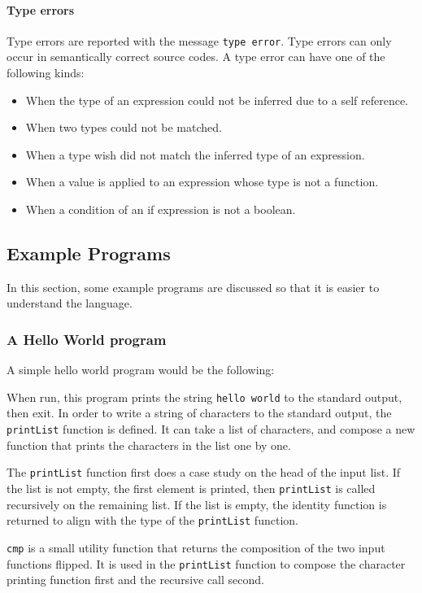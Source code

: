 \documentclass[12pt]{article}
\begin{document}
\paragraph{Type errors} Type errors are reported with the message
\verb$type error$. Type errors can only occur in semantically correct source
codes. A type error can have one of the following kinds:
\begin{itemize}
    \item When the type of an expression could not be inferred due to a self
        reference.
    \item When two types could not be matched.
    \item When a type wish did not match the inferred type of an expression.
    \item When a value is applied to an expression whose type is not a function.
    \item When a condition of an if expression is not a boolean.
\end{itemize}

\subsection{Example Programs}
\lstset{numbers=left}

In this section, some example programs are discussed so that it is easier to
understand the language.

\subsubsection{A Hello World program}

A simple hello world program would be the following:


When run, this program prints the string \verb$hello world$ to the standard
output, then exit. In order to write a string of characters to the standard
output, the \verb$printList$ function is defined. It can take a list of
characters, and compose a new function that prints the characters in the list
one by one.

The \verb$printList$ function first does a case study on the head of the input
list. If the list is not empty, the first element is printed, then
\verb$printList$ is called recursively on the remaining list. If the list is
empty, the identity function is returned to align with the type of the
\verb$printList$ function.

\verb$cmp$ is a small utility function that returns the composition of the two
input functions flipped. It is used in the \verb$printList$ function to compose
the character printing function first and the recursive call second.
\end{document}
